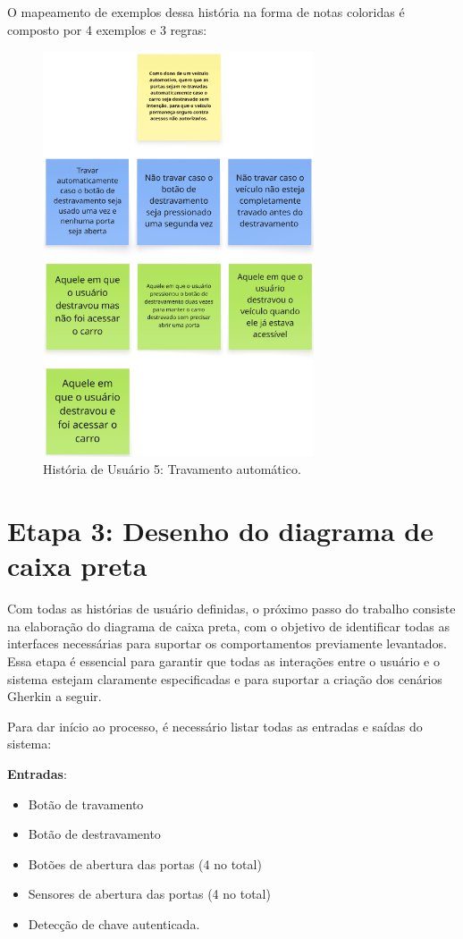 O mapeamento de exemplos dessa história na forma de notas coloridas é composto por 4 exemplos e 3 regras:

\begin{figure}[H]
\centering
\includegraphics[height=12cm]{figuras/user_story_5.png}
\caption{História de Usuário 5: Travamento automático.}
\end{figure}

\section{Etapa 3: Desenho do diagrama de caixa preta}
Com todas as histórias de usuário definidas, o próximo passo do trabalho consiste na elaboração do diagrama de caixa preta, com o objetivo de identificar todas as 
interfaces necessárias para suportar os comportamentos previamente levantados. Essa etapa é essencial para garantir que todas as interações entre o usuário e o 
sistema estejam claramente especificadas e para suportar a criação dos cenários Gherkin a seguir.

Para dar início ao processo, é necessário listar todas as entradas e saídas do sistema:

\textbf{Entradas}:

\begin{itemize}
    \item Botão de travamento
    \item Botão de destravamento
    \item Botões de abertura das portas (4 no total)
    \item Sensores de abertura das portas (4 no total)
    \item Detecção de chave autenticada.
\end{itemize}

